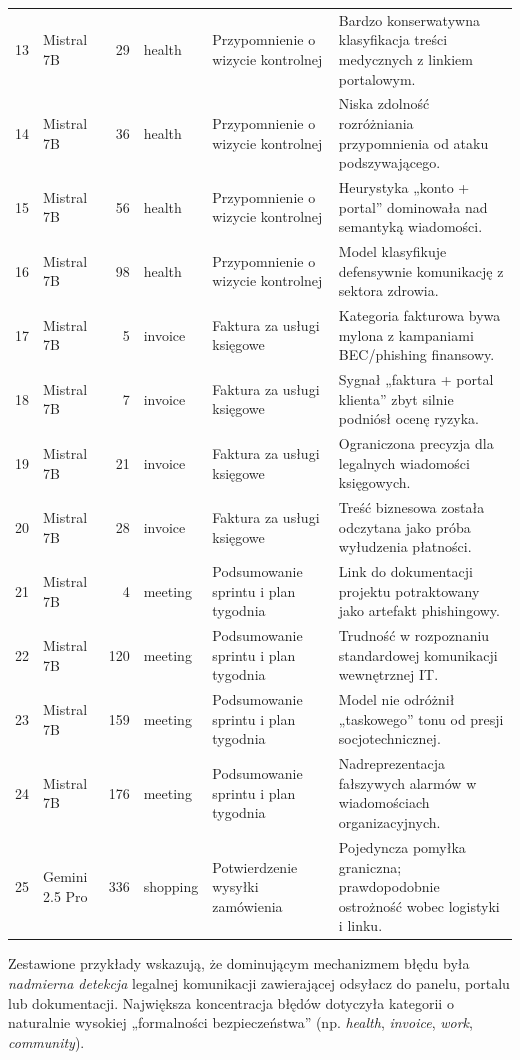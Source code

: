 \documentclass[12pt,a4paper,openright]{report}
\begin{document}
\begin{center}
\begin{longtable}{r l r l p{3.2cm} p{4.8cm}}
13 & Mistral 7B & 29 & health & Przypomnienie o wizycie kontrolnej & Bardzo konserwatywna klasyfikacja treści medycznych z linkiem portalowym. \\
14 & Mistral 7B & 36 & health & Przypomnienie o wizycie kontrolnej & Niska zdolność rozróżniania przypomnienia od ataku podszywającego. \\
15 & Mistral 7B & 56 & health & Przypomnienie o wizycie kontrolnej & Heurystyka „konto + portal” dominowała nad semantyką wiadomości. \\
16 & Mistral 7B & 98 & health & Przypomnienie o wizycie kontrolnej & Model klasyfikuje defensywnie komunikację z sektora zdrowia. \\
17 & Mistral 7B & 5 & invoice & Faktura za usługi księgowe & Kategoria fakturowa bywa mylona z kampaniami BEC/phishing finansowy. \\
18 & Mistral 7B & 7 & invoice & Faktura za usługi księgowe & Sygnał „faktura + portal klienta” zbyt silnie podniósł ocenę ryzyka. \\
19 & Mistral 7B & 21 & invoice & Faktura za usługi księgowe & Ograniczona precyzja dla legalnych wiadomości księgowych. \\
20 & Mistral 7B & 28 & invoice & Faktura za usługi księgowe & Treść biznesowa została odczytana jako próba wyłudzenia płatności. \\
21 & Mistral 7B & 4 & meeting & Podsumowanie sprintu i plan tygodnia & Link do dokumentacji projektu potraktowany jako artefakt phishingowy. \\
22 & Mistral 7B & 120 & meeting & Podsumowanie sprintu i plan tygodnia & Trudność w rozpoznaniu standardowej komunikacji wewnętrznej IT. \\
23 & Mistral 7B & 159 & meeting & Podsumowanie sprintu i plan tygodnia & Model nie odróżnił „taskowego” tonu od presji socjotechnicznej. \\
24 & Mistral 7B & 176 & meeting & Podsumowanie sprintu i plan tygodnia & Nadreprezentacja fałszywych alarmów w wiadomościach organizacyjnych. \\
25 & Gemini 2.5 Pro & 336 & shopping & Potwierdzenie wysyłki zamówienia & Pojedyncza pomyłka graniczna; prawdopodobnie ostrożność wobec logistyki i linku. \\
\bottomrule
\end{longtable}
\end{center}

Zestawione przykłady wskazują, że dominującym mechanizmem błędu była \textit{nadmierna detekcja} legalnej komunikacji zawierającej odsyłacz do panelu, portalu lub dokumentacji. Największa koncentracja błędów dotyczyła kategorii o naturalnie wysokiej „formalności bezpieczeństwa” (np. \textit{health}, \textit{invoice}, \textit{work}, \textit{community}).
\end{document}

